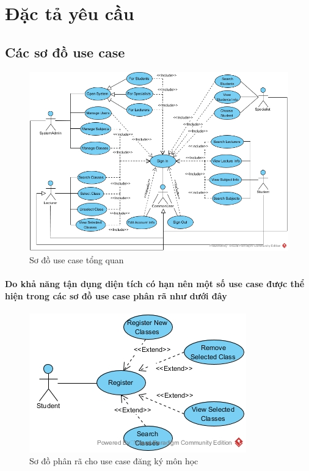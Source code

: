 \documentclass[12pt]{article}
\begin{document}
\section{Đặc tả yêu cầu}

  \subsection{Các sơ đồ use case}

  \FloatBarrier
  \begin{figure}[ht]
    \centering
    \includegraphics[scale=0.4]{../pictures/projectdiagrams/uc.jpg}
    \caption{Sơ đồ use case tổng quan}
  \end{figure}
  \FloatBarrier

  \paragraph{
    \textnormal{Do khả năng tận dụng diện tích có hạn nên một số use case được thể hiện trong các sơ đồ use case phân rã như dưới đây}
  }

  \FloatBarrier
  \begin{figure}[ht]
    \centering
    \includegraphics[scale=0.5]{../pictures/projectdiagrams/Register-uc-destructing.jpg}
    \caption{Sơ đồ phân rã cho use case đăng ký môn học}
  \end{figure}
  \FloatBarrier
\end{document}
